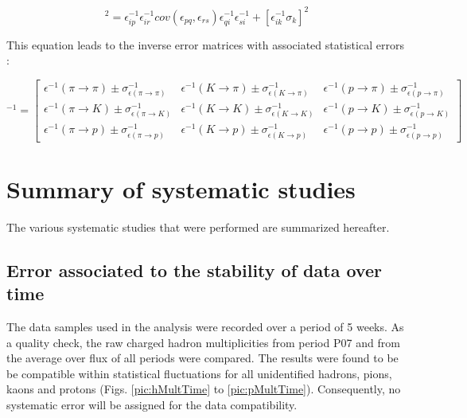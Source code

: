 \begin{equation}
  [\sigma^{-1}_i]^2 = \epsilon^{-1}_{ip}\epsilon^{-1}_{ir}cov(\epsilon_{pq},\epsilon_{rs})\epsilon^{-1}_{qi}\epsilon^{-1}_{si} + [\epsilon^{-1}_{ik}\sigma_k]^2
\end{equation}

This equation leads to the inverse error matrices with associated statistical errors :

\begin{equation}
[M^{\pm}_{RICH}]^{-1}
=
\begin{bmatrix}
\epsilon^{-1}(\pi \rightarrow \pi)\pm\sigma^{-1}_{\epsilon(\pi \rightarrow \pi)} & \epsilon^{-1}(K \rightarrow \pi)\pm\sigma^{-1}_{\epsilon(K \rightarrow \pi)} & \epsilon^{-1}(p \rightarrow \pi)\pm\sigma^{-1}_{\epsilon(p \rightarrow \pi)}\\
\epsilon^{-1}(\pi \rightarrow K)\pm\sigma^{-1}_{\epsilon(\pi \rightarrow K)} & \epsilon^{-1}(K \rightarrow K)\pm\sigma^{-1}_{\epsilon(K \rightarrow K)} & \epsilon^{-1}(p \rightarrow K)\pm\sigma^{-1}_{\epsilon(p \rightarrow K)} \\
\epsilon^{-1}(\pi \rightarrow p)\pm\sigma^{-1}_{\epsilon(\pi \rightarrow p)} & \epsilon^{-1}(K \rightarrow p)\pm\sigma^{-1}_{\epsilon(K \rightarrow p)} & \epsilon^{-1}(p \rightarrow p)\pm\sigma^{-1}_{\epsilon(p \rightarrow p)}
\end{bmatrix}
\end{equation}


\section{Summary of systematic studies}

The various systematic studies that were performed are summarized hereafter.


\subsection{Error associated to the stability of data over time}

The data samples used in the analysis were recorded over a period of 5 weeks. As a quality check, the raw charged hadron multiplicities from period P07 and from the average over flux of all periods were compared. The results were found to be be compatible within statistical fluctuations for all unidentified hadrons, pions, kaons and protons (Figs. \ref{pic:hMultTime} to \ref{pic:pMultTime}). Consequently, no systematic error will be assigned for the data compatibility.


